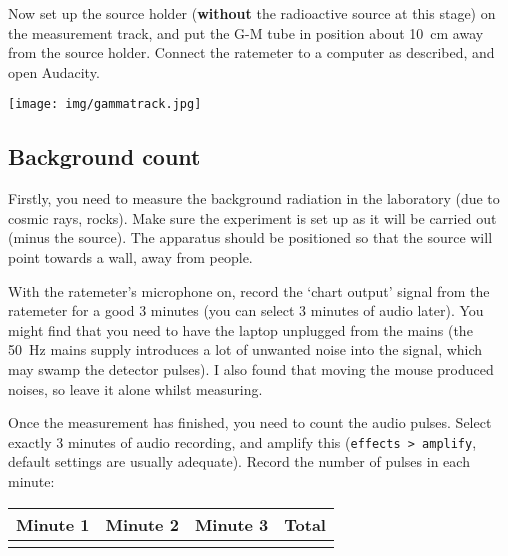 Now set up the source holder ({\bf without} the radioactive source at this stage) on the measurement track, and put the G-M tube in position about \SI{10}{cm} away from the source holder.  Connect the ratemeter to a computer as described, and open Audacity.

\begin{center}
\texttt{[image: img/gammatrack.jpg]}
\end{center}

\subsection{Background count}
Firstly, you need to measure the background radiation in the laboratory (due to cosmic rays, rocks).  Make sure the experiment is set up as it will be carried out (minus the source).  The apparatus should be positioned so that the source will point towards a wall, away from people.

With the ratemeter's microphone on, record the `chart output' signal from the ratemeter for a good 3 minutes (you can select 3 minutes of audio later).  You might find that you need to have the laptop unplugged from the mains (the \SI{50}{Hz} mains supply introduces a lot of unwanted noise into the signal, which may swamp the detector pulses).  I also found that moving the mouse produced noises, so leave it alone whilst measuring.

Once the measurement has finished, you need to count the audio pulses.  Select exactly 3 minutes of audio recording, and amplify this (\texttt{effects > amplify}, default settings are usually adequate).  Record the number of pulses in each minute:\\

\noindent\begin{tabular}{|p{2cm}|p{2cm}|p{2cm}|p{2cm}|}
\hline
Minute 1 & Minute 2 & Minute 3 & Total\\
\hline
&&&\\
\hline
\end{tabular}\\

